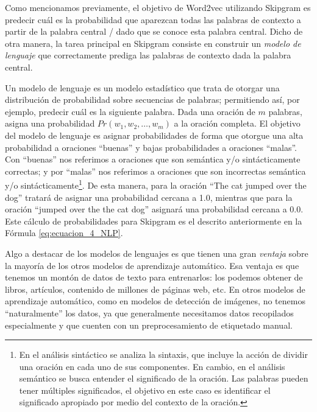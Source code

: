 \documentclass[12pt,a4paper]{article}
\begin{document}
\begin{sloppypar}
Como mencionamos previamente, el objetivo de Word2vec utilizando Skipgram es predecir cuál es la probabilidad que aparezcan todas las palabras de contexto a partir de la palabra central / dado que se conoce esta palabra central. Dicho de otra manera, la tarea principal en Skipgram consiste en construir un \textit{modelo de lenguaje} que correctamente prediga las palabras de contexto dada la palabra central. 

Un modelo de lenguaje es un modelo estadístico que trata de otorgar una distribución de probabilidad sobre secuencias de palabras; permitiendo así, por ejemplo, predecir cuál es la siguiente palabra. Dada una oración de $m$ palabras, asigna una probabilidad $Pr(w_1, w_2, …, w_m)$ a la oración completa. El objetivo del modelo de lenguaje es asignar probabilidades de forma que otorgue una alta probabilidad a oraciones “buenas” y bajas probabilidades a oraciones “malas”. Con “buenas” nos referimos a oraciones que son semántica y/o sintácticamente correctas; y por “malas” nos referimos a oraciones que son incorrectas semántica y/o sintácticamente\footnote{En el análisis sintáctico se analiza la sintaxis, que incluye la acción de dividir una oración en cada uno de sus componentes. En cambio, en el análisis semántico se busca entender el significado de la oración. Las palabras pueden tener múltiples significados, el objetivo en este caso es identificar el significado apropiado por medio del contexto de la oración.}. De esta manera, para la oración “The cat jumped over the dog” tratará de asignar una probabilidad cercana a 1.0, mientras que para la oración “jumped over the the cat dog” asignará una probabilidad cercana a 0.0\cite{NLP_26}. Este cálculo de probabilidades para Skipgram es el descrito anteriormente en la Fórmula \ref{eq:ecuacion_4_NLP}.

Algo a destacar de los modelos de lenguajes es que tienen una gran \textit{ventaja} sobre la mayoría de los otros modelos de aprendizaje automático. Esa ventaja es que tenemos un montón de datos de texto para entrenarlos: los podemos obtener de libros, artículos, contenido de millones de páginas web, etc. En otros modelos de aprendizaje automático, como en modelos de detección de imágenes, no tenemos “naturalmente” los datos, ya que generalmente necesitamos datos recopilados especialmente y que cuenten con un preprocesamiento de etiquetado manual. 


\end{sloppypar}
\end{document}
